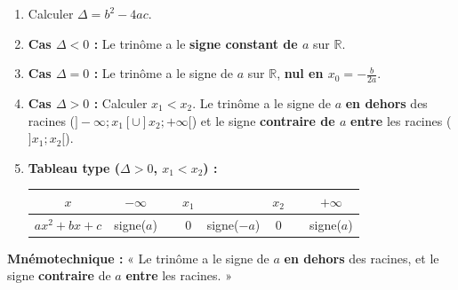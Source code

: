 \documentclass[11pt]{article}
\begin{document}
\begin{methode}
    \begin{enumerate}
        \item Calculer $\Delta = b^2-4ac$.
        \item \textbf{Cas $\Delta < 0$ :} Le trinôme a le \textbf{signe constant de $a$} sur $\mathbb{R}$.
        \item \textbf{Cas $\Delta = 0$ :} Le trinôme a le signe de $a$ sur $\mathbb{R}$, \textbf{nul en $x_0 = -\frac{b}{2a}$}.
        \item \textbf{Cas $\Delta > 0$ :} Calculer $x_1 < x_2$. Le trinôme a le signe de $a$ \textbf{en dehors} des racines ($]-\infty; x_1[ \cup ]x_2; +\infty[$) et le signe \textbf{contraire de $a$} \textbf{entre} les racines ($]x_1; x_2[$).
        \item \textbf{Tableau type ($\Delta > 0$, $x_1 < x_2$) :}
        \begin{center}
        \begin{tabular}{|c|ccccccc|}\hline
        $x$ & $-\infty$ & & $x_1$ & & $x_2$ & & $+\infty$ \\ \hline
        $ax^2+bx+c$ & signe($a$) & & $0$ & signe($-a$) & $0$ & & signe($a$) \\ \hline
        \end{tabular}
        \end{center}
    \end{enumerate}
    \textbf{Mnémotechnique :} « Le trinôme a le signe de $a$ \textbf{en dehors} des racines, et le signe \textbf{contraire} de $a$ \textbf{entre} les racines. »
\end{methode}
\end{document}
